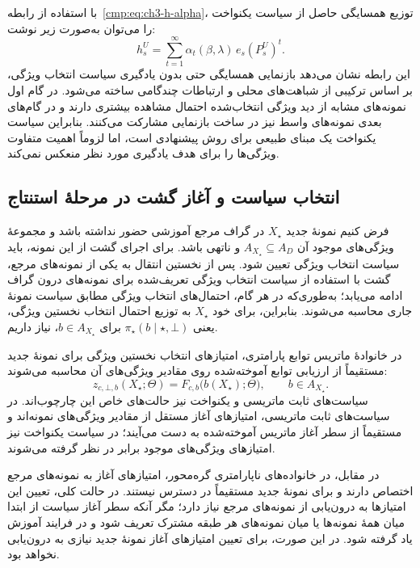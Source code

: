با استفاده از رابطه~\eqref{cmp:eq:ch3-h-alpha}، توزیع همسایگی حاصل از سیاست یکنواخت را می‌توان به‌صورت زیر نوشت:
\begin{equation}\label{cmp:eq:ch3-uniform-h}
h_s^{U}=\sum_{t=1}^{\infty}
\alpha_t(\beta,\lambda)\,e_s(P_s^{U})^t.
\end{equation}
این رابطه نشان می‌دهد بازنمایی همسایگی حتی بدون یادگیری سیاست انتخاب ویژگی، بر اساس ترکیبی از شباهت‌های محلی و ارتباطات چندگامی ساخته می‌شود. در گام اول نمونه‌های مشابه از دید ویژگی انتخاب‌شده احتمال مشاهده بیشتری دارند و در گام‌های بعدی نمونه‌های واسط نیز در ساخت بازنمایی مشارکت می‌کنند. بنابراین سیاست یکنواخت یک مبنای طبیعی برای روش پیشنهادی است، اما لزوماً اهمیت متفاوت ویژگی‌ها را برای هدف یادگیری مورد نظر منعکس نمی‌کند.




\subsection{انتخاب سیاست و آغاز گشت در مرحلهٔ استنتاج}
\label{cmp:subsec:ch3-out-of-graph-policy}
فرض کنیم نمونهٔ جدید $X_\star$ در گراف مرجع آموزشی حضور نداشته باشد
و مجموعهٔ ویژگی‌های موجود آن $A_{X_\star}\subseteq A_D$ و ناتهی باشد.
برای اجرای گشت از این نمونه، باید سیاست انتخاب ویژگی تعیین شود.
پس از نخستین انتقال به یکی از نمونه‌های مرجع، گشت با استفاده از
سیاست انتخاب ویژگی تعریف‌شده برای نمونه‌های درون گراف ادامه می‌یابد؛
به‌طوری‌که در هر گام، احتمال‌های انتخاب ویژگی مطابق سیاست نمونهٔ جاری
محاسبه می‌شوند. بنابراین، برای خود $X_\star$ به توزیع احتمال
انتخاب نخستین ویژگی، یعنی $\pi_\star(b\mid\star,\bot)$ برای
$b\in A_{X_\star}$، نیاز داریم.

در خانوادهٔ ماتریس توابع پارامتری، امتیازهای انتخاب نخستین ویژگی
برای نمونهٔ جدید مستقیماً از ارزیابی توابع آموخته‌شده روی مقادیر
ویژگی‌های آن محاسبه می‌شوند:
\begin{equation}\label{cmp:eq:ch3-out-of-graph-parametric-score}
z_{c,\bot,b}(X_\star;\Theta)
=
F_{c,b}\bigl(b(X_\star);\Theta\bigr),
\qquad b\in A_{X_\star}.
\end{equation}
سیاست‌های ثابت ماتریسی و یکنواخت نیز حالت‌های خاص این چارچوب‌اند.
در سیاست‌های ثابت ماتریسی، امتیازهای آغاز مستقل از مقادیر ویژگی‌های
نمونه‌اند و مستقیماً از سطر آغاز ماتریس آموخته‌شده به دست می‌آیند؛
در سیاست یکنواخت نیز امتیازهای ویژگی‌های موجود برابر در نظر گرفته می‌شوند.

در مقابل، در خانواده‌های ناپارامتری گره‌محور، امتیازهای آغاز به
نمونه‌های مرجع اختصاص دارند و برای نمونهٔ جدید مستقیماً در دسترس نیستند.
در حالت کلی، تعیین این امتیازها به درون‌یابی از نمونه‌های مرجع نیاز دارد؛
مگر آنکه سطر آغاز سیاست از ابتدا میان همهٔ نمونه‌ها یا میان نمونه‌های
هر طبقه مشترک تعریف شود و در فرایند آموزش یاد گرفته شود.
در این صورت، برای تعیین امتیازهای آغاز نمونهٔ جدید نیازی
به درون‌یابی نخواهد بود.

